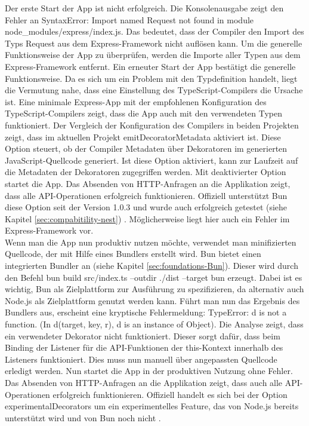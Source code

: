 \noindent
Der erste Start der App ist nicht erfolgreich. Die Konsolenausgabe zeigt den Fehler an \glqq SyntaxError: Import named Request not found in module node\_modules/express/index.js\grqq{}. Das bedeutet, dass der Compiler den Import des Typs \glqq Request\grqq{} aus dem Express-Framework nicht auflösen kann. Um die generelle Funktionsweise der App zu überprüfen, werden die Importe aller Typen aus dem Express-Framework entfernt. Ein erneuter Start der App bestätigt die generelle Funktionsweise. Da es sich um ein Problem mit den Typdefinition handelt, liegt die Vermutung nahe, dass eine Einstellung des TypeScript-Compilers die Ursache ist. Eine minimale Express-App mit der empfohlenen Konfiguration des TypeScript-Compilers zeigt, dass die App auch mit den verwendeten Typen funktioniert. Der Vergleich der Konfiguration des Compilers in beiden Projekten zeigt, dass im aktuellen Projekt \glqq emitDecoratorMetadata\grqq{} aktiviert ist. Diese Option steuert, ob der Compiler Metadaten über Dekoratoren im generierten JavaScript-Quellcode generiert. Ist diese Option aktiviert, kann zur Laufzeit auf die Metadaten der Dekoratoren zugegriffen werden. Mit deaktivierter Option startet die App. Das Absenden von HTTP-Anfragen an die Applikation zeigt, dass alle API-Operationen erfolgreich funktionieren. Offiziell unterstützt Bun diese Option seit der Version 1.0.3 und wurde auch erfolgreich getestet (siehe Kapitel \ref{sec:compabitility-nest}) \cite{McDonnel.2023}. Möglicherweise liegt hier auch ein Fehler im Express-Framework vor.\\

\noindent
Wenn man die App nun produktiv nutzen möchte, verwendet man minifizierten Quellcode, der mit Hilfe eines Bundlers erstellt wird. Bun bietet einen integrierten Bundler an (siehe Kapitel \ref{sec:foundations-Bun}). Dieser wird durch den Befehl \glqq bun build src/index.ts --outdir ./dist --target bun\grqq{} erzeugt. Dabei ist es wichtig, Bun als Zielplattform zur Ausführung zu spezifizieren, da alternativ auch Node.js als Zielplattform genutzt werden kann. Führt man nun das Ergebnis des Bundlers aus, erscheint eine kryptische Fehlermeldung: \glqq TypeError: d is not a function. (In d(target, key, r), d is an instance of Object)\grqq{}. Die Analyse zeigt, dass ein verwendeter Dekorator nicht funktioniert. Dieser sorgt dafür, dass beim Binding der Listener für die API-Funktionen  der this-Kontext innerhalb des Listeners funktioniert. Dies muss nun manuell über angepassten Quellcode erledigt werden. Nun startet die App in der produktiven Nutzung ohne Fehler. Das Absenden von HTTP-Anfragen an die Applikation zeigt, dass auch alle API-Operationen erfolgreich funktionieren. Offiziell handelt es sich bei der Option \glqq experimentalDecorators\grqq{} um ein experimentelles Feature, das von Node.js bereits unterstützt wird und von Bun noch nicht \cite{Microsoft.2023}.

